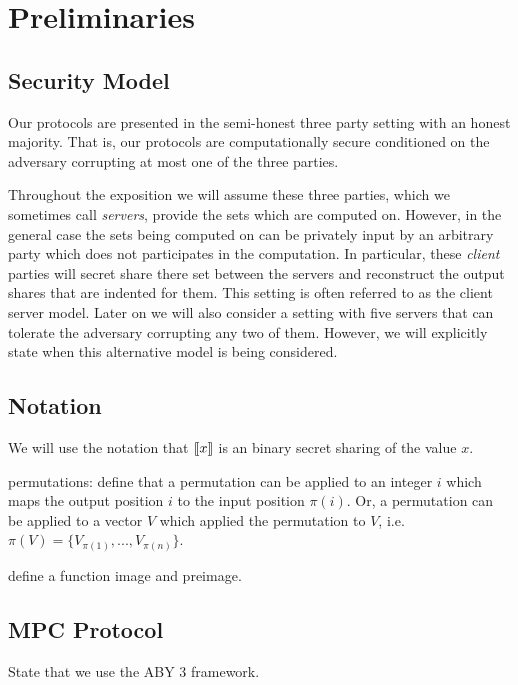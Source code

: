 \section{Preliminaries} \label{sec:prelim}


\subsection{Security Model}

Our protocols are presented in the semi-honest three party setting with an honest majority. That is, our protocols are computationally secure conditioned on the adversary corrupting at most one of the three parties. 



Throughout the exposition we will assume these three parties, which we sometimes call \emph{servers}, provide the sets which are computed on. However, in the general case the sets being computed on can be privately input by an arbitrary party which does not participates in the computation. In particular, these \emph{client} parties will secret share there set between the servers and reconstruct the output shares that are indented for them. This setting is often referred to as the client server model\cite{aby3, secureML}. Later on we will also consider a setting with five servers that can tolerate the adversary corrupting any two of them. However, we will explicitly state when this alternative model is being considered.



\subsection{Notation}

We will use the notation that $\llbracket x\rrbracket$ is an binary secret sharing of the value $x$.

permutations: define that a permutation can be applied to an integer $i$ which maps the output position $i$ to the input position $\pi(i)$. Or, a permutation can be applied to a vector $V$ which applied the permutation to $V$, i.e. $\pi(V)=\{V_{\pi(1)}, ..., V_{\pi(n)}\}$. 


define a function image and preimage.


\subsection{MPC Protocol}

State that we use the ABY 3 framework. 

